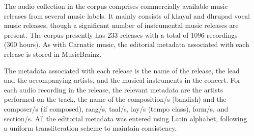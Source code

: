 The audio collection in the corpus comprises commercially available music releases from several music labels. It mainly consists of \gls{khayal} and \gls{dhrupad} vocal music releases, though a significant number of instrumental music releases are present. The corpus presently has 233 releases with a total of 1096 recordings (300 hours). As with Carnatic music, the editorial metadata associated with each release is stored in MusicBrainz. 

The metadata associated with each release is the name of the release, the lead and the accompanying artists, and the musical instruments in the concert. For each audio recording in the release, the relevant metadata are the artists performed on the track, the name of the composition/s (\gls{bandish}) and the composer/s (if composed), \gls{raag}/s, \gls{taal}/s, \gls{lay}/s (tempo class), form/s, and section/s. All the editorial metadata was entered using Latin alphabet, following a uniform transliteration scheme to maintain consistency. 

